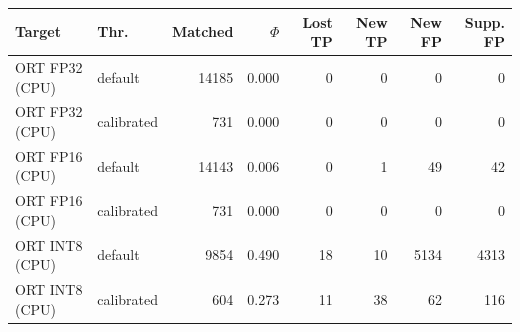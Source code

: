 \begin{tabular}{llrrrrrr}
\toprule
\textbf{Target} & \textbf{Thr.} & \textbf{Matched} & $\Phi$ & \textbf{Lost TP} & \textbf{New TP} & \textbf{New FP} & \textbf{Supp. FP} \\
\midrule
ORT FP32 (CPU) & default & 14185 & 0.000 & 0 & 0 & 0 & 0 \\
ORT FP32 (CPU) & calibrated & 731 & 0.000 & 0 & 0 & 0 & 0 \\
ORT FP16 (CPU) & default & 14143 & 0.006 & 0 & 1 & 49 & 42 \\
ORT FP16 (CPU) & calibrated & 731 & 0.000 & 0 & 0 & 0 & 0 \\
ORT INT8 (CPU) & default & 9854 & 0.490 & 18 & 10 & 5134 & 4313 \\
ORT INT8 (CPU) & calibrated & 604 & 0.273 & 11 & 38 & 62 & 116 \\
\bottomrule
\end{tabular}
